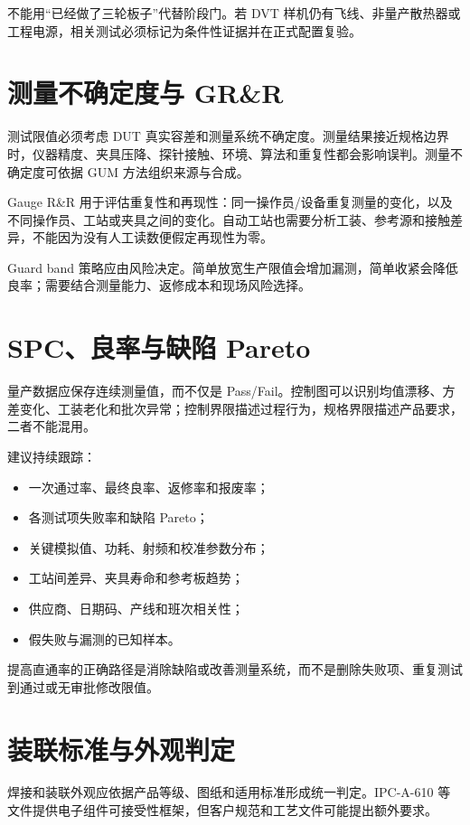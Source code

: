 不能用“已经做了三轮板子”代替阶段门。若 DVT 样机仍有飞线、非量产散热器或工程电源，相关测试必须标记为条件性证据并在正式配置复验。

\section{测量不确定度与 GR\&R}

测试限值必须考虑 DUT 真实容差和测量系统不确定度。测量结果接近规格边界时，仪器精度、夹具压降、探针接触、环境、算法和重复性都会影响误判。测量不确定度可依据 GUM 方法组织来源与合成\cite{jcgm100}。

Gauge R\&R 用于评估重复性和再现性：同一操作员/设备重复测量的变化，以及不同操作员、工站或夹具之间的变化。自动工站也需要分析工装、参考源和接触差异，不能因为没有人工读数便假定再现性为零。

Guard band 策略应由风险决定。简单放宽生产限值会增加漏测，简单收紧会降低良率；需要结合测量能力、返修成本和现场风险选择。

\section{SPC、良率与缺陷 Pareto}

量产数据应保存连续测量值，而不仅是 Pass/Fail。控制图可以识别均值漂移、方差变化、工装老化和批次异常；控制界限描述过程行为，规格界限描述产品要求，二者不能混用。

建议持续跟踪：
\begin{itemize}
  \item 一次通过率、最终良率、返修率和报废率；
  \item 各测试项失败率和缺陷 Pareto；
  \item 关键模拟值、功耗、射频和校准参数分布；
  \item 工站间差异、夹具寿命和参考板趋势；
  \item 供应商、日期码、产线和班次相关性；
  \item 假失败与漏测的已知样本。
\end{itemize}

提高直通率的正确路径是消除缺陷或改善测量系统，而不是删除失败项、重复测试到通过或无审批修改限值。

\section{装联标准与外观判定}

焊接和装联外观应依据产品等级、图纸和适用标准形成统一判定。IPC-A-610 等文件提供电子组件可接受性框架，但客户规范和工艺文件可能提出额外要求\cite{ipc-a-610}。

